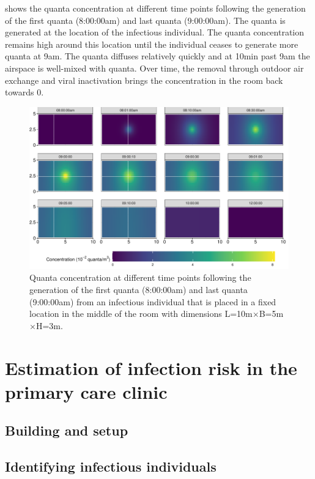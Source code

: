 \documentclass[fleqn,11pt]{wlscirep_supp}
\begin{document}
 shows the quanta concentration at different time points following the generation of the first quanta (8:00:00am) and last quanta (9:00:00am). The quanta is generated at the location of the infectious individual. The quanta concentration remains high around this location until the individual ceases to generate more quanta at 9am. The quanta diffuses relatively quickly and at 10min past 9am the airspace is well-mixed with quanta. Over time, the removal through outdoor air exchange and viral inactivation brings the concentration in the room back towards 0. 

\begin{figure}
    \centering
    \includegraphics{../../tests/stm_v2-toy_example.pdf}
    \caption{Quanta concentration at different time points following the generation of the first quanta (8:00:00am) and last quanta (9:00:00am) from an infectious individual that is placed in a fixed location in the middle of the room with dimensions L=10m$\times$B=5m$\times$H=3m.}
    \label{fig:toy-example}
\end{figure}

\clearpage


\section{Estimation of infection risk in the primary care clinic}

\subsection{Building and setup}

\subsection{Identifying infectious individuals}
\end{document}

